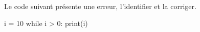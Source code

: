 \documentclass[11pt, a4paper]{report}
\begin{document}
    \begin{minipage}{0.48\linewidth}
        \begin{exercice_cours}[Débogage]
         Le code suivant présente une erreur, l'identifier et la corriger.
    \end{exercice_cours}

    \end{minipage}\hfill
    \begin{minipage}{0.48\linewidth}
\begin{blocvisible}[height=3.]
    \begin{CodePythontexAlt}[TaillePolice=\large, Largeur=1\linewidth,Centre,Lignes=true,PremLigne=1]{}
i = 10
while i > 0:
    print(i)
    \end{CodePythontexAlt}
\end{blocvisible}
    \end{minipage}

    
\end{document}
